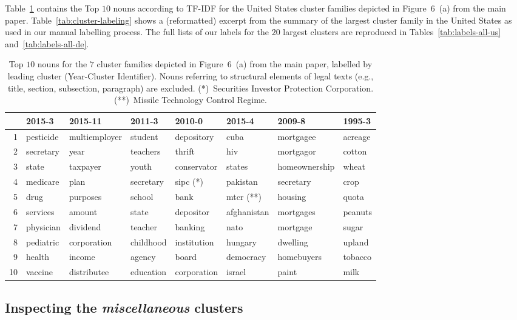 Table~\ref{tab:cluster-labeling-alt} contains the Top $10$ nouns according to TF-IDF for the United States cluster families depicted in Figure~6~(a) from the main paper. 
Table~\ref{tab:cluster-labeling} shows a (reformatted) excerpt from the summary of the largest cluster family in the United States as used in our manual labelling process.
The full lists of our labels for the $20$ largest clusters are reproduced in Tables~\ref{tab:labels-all-us} and~\ref{tab:labels-all-de}.

\begin{table}[H]
	\centering\footnotesize
	\bgroup
	\def\arraystretch{1.5}
	\begin{tabular}{r|p{}p{}p{}p{}p{}p{}p{}}
		&\textbf{2015-3}&\textbf{2015-11}&\textbf{2011-3}&\textbf{2010-0}&\textbf{2015-4}&\textbf{2009-8}&\textbf{1995-3}\\\hline
		1&pesticide&multiemployer&student&depository&cuba&mortgagee&acreage\\
		2&secretary&year&teachers&thrift&hiv&mortgagor&cotton\\
		3&state&taxpayer&youth&conservator&states&homeownership&wheat\\
		4&medicare&plan&secretary&sipc (*)&pakistan&secretary&crop\\
		5&drug&purposes&school&bank&mtcr (**)&housing&quota\\
		6&services&amount&state&depositor&afghanistan&mortgages&peanuts\\
		7&physician&dividend&teacher&banking&nato&mortgage&sugar\\
		8&pediatric&corporation&childhood&institution&hungary&dwelling&upland\\
		9&health&income&agency&board&democracy&homebuyers&tobacco\\
		10&vaccine&distributee&education&corporation&israel&paint&milk\\
	\end{tabular}
	\egroup
	\caption{Top $10$ nouns for the $7$ cluster families depicted in Figure~6~(a) from the main paper, labelled by leading cluster (Year-Cluster Identifier).
	Nouns referring to structural elements of legal texts (e.g., title, section, subsection, paragraph) are excluded. 
	(*)~Securities Investor Protection Corporation. (**)~Missile Technology Control Regime.
	}
	\label{tab:cluster-labeling-alt}
\end{table}

\subsection{Inspecting the \emph{miscellaneous} clusters}

